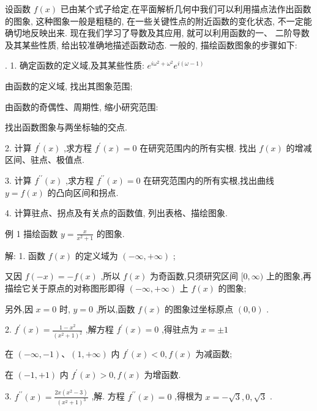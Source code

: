 \documentclass[10pt]{article}
\begin{document}
设函数 \(f\left( x\right)\) 已由某个式子给定,在平面解析几何中我们可以利用描点法作出函数的图象, 这种图象一般是粗糙的, 在一些关键性点的附近函数的变化状态, 不一定能确切地反映出来. 现在我们学习了导数及其应用, 就可以利用函数的一、 二阶导数及其某些性质, 给出较准确地描述函数动态. 一般的, 描绘函数图象的步骤如下:

. 1. 确定函数的定义域,及其某些性质: \({e}^{i{\omega }^{2} + {\omega }^{2}}{e}^{i\left( {\omega - 1}\right) }\)

由函数的定义域, 找出其图象范围;

由函数的奇偶性、周期性, 缩小研究范围:

找出函数图象与两坐标轴的交点.

2. 计算 \({f}^{\prime }\left( x\right)\) ,求方程 \({f}^{\prime }\left( x\right) = 0\) 在研究范围内的所有实根. 找出 \(f\left( x\right)\) 的增减区间、驻点、极值点.

3. 计算 \({f}^{\prime \prime }\left( x\right)\) ,求方程 \({f}^{\prime \prime }\left( x\right) = 0\) 在研究范围内的所有实根,找出曲线 \(y = f\left( x\right)\) 的凸向区间和拐点.

4. 计算驻点、拐点及有关点的函数值, 列出表格、描绘图象.

例 1 描绘函数 \(y = \frac{x}{{x}^{2} + 1}\) 的图象.

解: 1. 函数 \(f\left( x\right)\) 的定义域为 \(\left( {-\infty , + \infty }\right)\) ;

又因 \(f\left( {-x}\right) = - f\left( x\right)\) ,所以 \(f\left( x\right)\) 为奇函数,只须研究区间 \(\lbrack 0,\infty )\) 上的图象,再描绘它关于原点的对称图形即得 \(\left( {-\infty , + \infty }\right)\) 上 \(f\left( x\right)\) 的图象;

另外,因 \(x = 0\) 时, \(y = 0\) ,所以,函数 \(f\left( x\right)\) 的图象过坐标原点 \(\left( {0,0}\right)\) .

2. \({f}^{\prime }\left( x\right) = \frac{1 - {x}^{2}}{{\left( {x}^{2} + 1\right) }^{2}}\) ,解方程 \({f}^{\prime }\left( x\right) = 0\) ,得驻点为 \(x = \pm 1\)

在 \(\left( {-\infty , - 1}\right) \text{、}\left( {1, + \infty }\right)\) 内 \({f}^{\prime }\left( x\right) < 0,f\left( x\right)\) 为减函数;

在 \(\left( {-1, + 1}\right)\) 内 \({f}^{\prime }\left( x\right) > 0,f\left( x\right)\) 为增函数.

3. \({f}^{\prime \prime }\left( x\right) = \frac{{2x}\left( {{x}^{2} - 3}\right) }{{\left( {x}^{2} + 1\right) }^{3}}\) ,解. 方程 \({f}^{\prime \prime }\left( x\right) = 0\) ,得根为 \(x = - \sqrt{3},0,\sqrt{3}\) .
\end{document}
